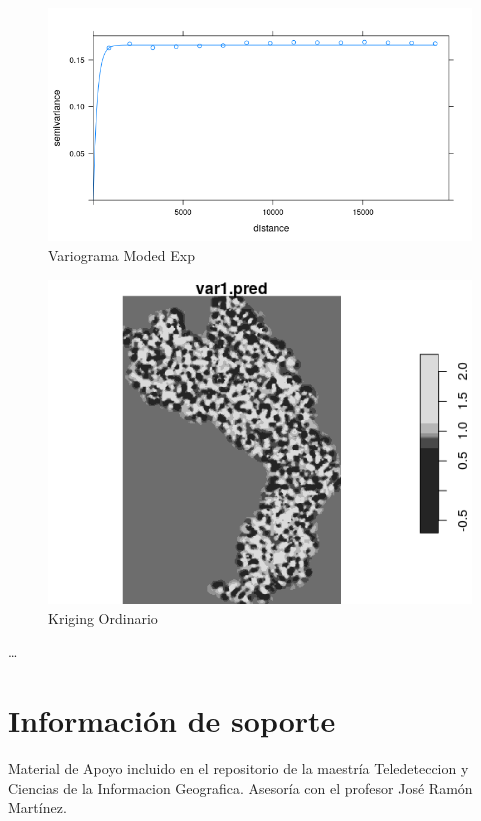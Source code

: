 \documentclass[11pt,]{article}
\begin{document}
\begin{figure}
\centering
\includegraphics{Imagenes/semivmodExp.png}
\caption{Variograma Moded Exp}
\end{figure}

\begin{figure}
\centering
\includegraphics{Imagenes/kriging.var1.pred.png}
\caption{Kriging Ordinario}
\end{figure}

\ldots

\section{Información de soporte}\label{informaciuxf3n-de-soporte}

Material de Apoyo incluido en el repositorio de la maestría
Teledeteccion y Ciencias de la Informacion Geografica. Asesoría con el
profesor José Ramón Martínez.
\end{document}
